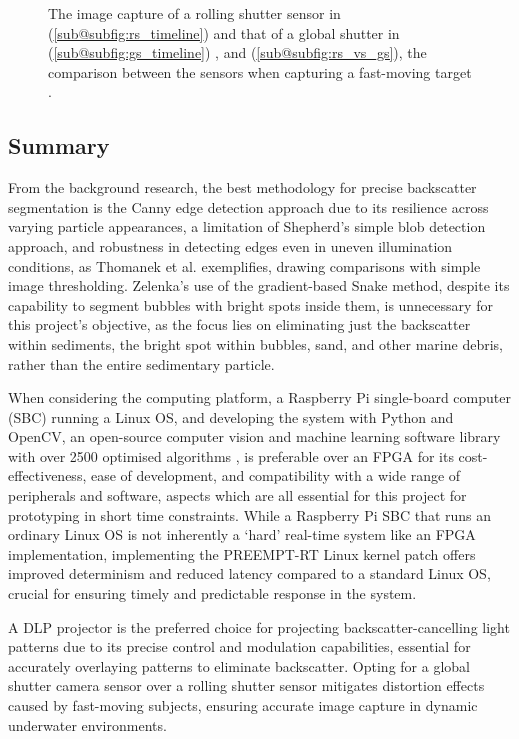 \begin{figure}[H]
\begin{subfigure}{0.45\textwidth}
        \caption{}
        \label{subfig:rs_vs_gs}
    \end{subfigure}
    \caption{The image capture of a rolling shutter sensor in (\ref{sub@subfig:rs_timeline}) and that of a global shutter in (\ref{sub@subfig:gs_timeline}) \cite{reddigitalcinemaGlobalRollingShutters}, and (\ref{sub@subfig:rs_vs_gs}), the comparison between the sensors when capturing a fast-moving target \cite{RollingShutterVs}.}
    \label{fig:rs_vs_gs}
\end{figure}

\subsection{Summary}
\label{bisummary}

From the background research, the best methodology for precise backscatter segmentation is the Canny edge detection approach due to its resilience across varying particle appearances, a limitation of Shepherd's simple blob detection approach, and robustness in detecting edges even in uneven illumination conditions, as Thomanek et al. exemplifies, drawing comparisons with simple image thresholding. Zelenka's use of the gradient-based Snake method, despite its capability to segment bubbles with bright spots inside them, is unnecessary for this project's objective, as the focus lies on eliminating just the backscatter within sediments, the bright spot within bubbles, sand, and other marine debris, rather than the entire sedimentary particle.

When considering the computing platform, a Raspberry Pi single-board computer (SBC) running a Linux OS, and developing the system with Python and OpenCV, an open-source computer vision and machine learning software library with over 2500 optimised algorithms \cite{opencv}, is preferable over an FPGA for its cost-effectiveness, ease of development, and compatibility with a wide range of peripherals and software, aspects which are all essential for this project for prototyping in short time constraints. While a Raspberry Pi SBC that runs an ordinary Linux OS is not inherently a `hard' real-time system like an FPGA implementation, implementing the PREEMPT-RT Linux kernel patch offers improved determinism and reduced latency compared to a standard Linux OS, crucial for ensuring timely and predictable response in the system.

A DLP projector is the preferred choice for projecting backscatter-cancelling light patterns due to its precise control and modulation capabilities, essential for accurately overlaying patterns to eliminate backscatter. Opting for a global shutter camera sensor over a rolling shutter sensor mitigates distortion effects caused by fast-moving subjects, ensuring accurate image capture in dynamic underwater environments.
